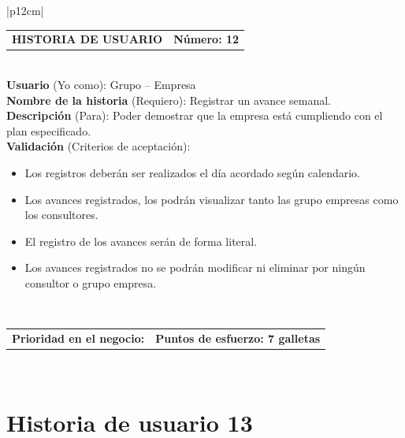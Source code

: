 \documentclass[11pt,letterpaper]{report}
\begin{document}
	\begin{center}	
		\begin{tabular}{|p{12cm}|}
			\hline
			\begin{tabular}{c|c}
				\textbf{HISTORIA DE USUARIO} & \textbf{Número: 12} \\
			\end{tabular} \\ \hline
			\textbf{Usuario} (Yo como): Grupo – Empresa \\ \hline
			\textbf{Nombre de la historia} (Requiero): Registrar un avance semanal. \\ \hline
			\textbf{Descripción} (Para): Poder demostrar que la empresa está cumpliendo con el plan especificado. \\ \hline
			\textbf{Validación} (Criterios de aceptación): \\
			\begin{minipage}{12cm}
				\begin{itemize}
					\item Los registros deberán ser realizados el día acordado según calendario.
					\item Los avances registrados, los podrán visualizar tanto las grupo empresas como los consultores.
					\item El registro de los avances serán de forma literal.
					\item Los avances registrados no se podrán modificar ni eliminar por ningún consultor o grupo empresa.
				\end{itemize}
			\end{minipage} \\ \hline
			\begin{tabular}{p{6cm}|c}
				\textbf{Prioridad en el negocio: } & \textbf{Puntos de esfuerzo: 7 galletas} \\
			\end{tabular} \\ \hline
		\end{tabular}
	\end{center}
	
	\section{Historia de usuario 13}
	
\end{document}
